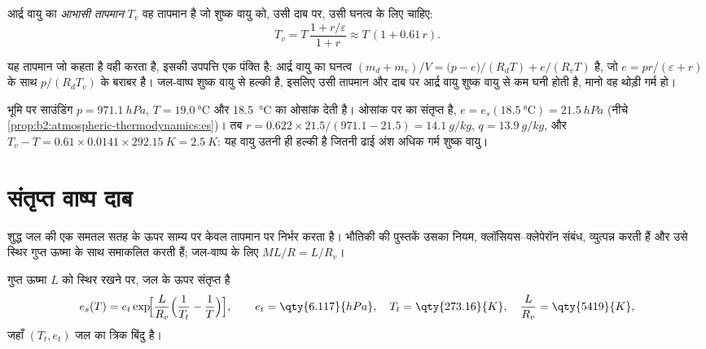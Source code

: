 \begin{definition}[आभासी तापमान]\label{def:b2:atmospheric-thermodynamics:virtual}
आर्द्र वायु का \emph{आभासी तापमान} $T_v$ वह तापमान है
जो शुष्क वायु को, उसी दाब पर, उसी घनत्व के लिए चाहिए:
\[
  T_v = T\,\frac{1 + r/\varepsilon}{1 + r} \approx T\,(1 + 0.61\,r) .
\]
\end{definition}

यह तापमान जो कहता है वही करता है, इसकी उपपत्ति एक पंक्ति है: आर्द्र वायु का घनत्व
$(m_d + m_v)/V = \bigl(p - e\bigr)/(R_dT) + e/(R_vT)$ है, जो $e = pr/(\varepsilon + r)$ के साथ
$p/(R_dT_v)$ के बराबर है। जल-वाष्प शुष्क वायु से हल्की है, इसलिए उसी तापमान और दाब पर आर्द्र वायु शुष्क
वायु से कम घनी होती है, मानो वह थोड़ी गर्म हो।

\begin{example}[नॉर्मन की वायु]\label{ex:b2:atmospheric-thermodynamics:norman}
भूमि पर साउंडिंग $p = \qty{971.1}{hPa}$, $T = \qty{19.0}{\celsius}$ और
\qty{18.5}{\celsius} का ओसांक देती है।  ओसांक पर का संतृप्त  है,
$e = e_s(\qty{18.5}{\celsius}) = \qty{21.5}{hPa}$ (नीचे \cref{prop:b2:atmospheric-thermodynamics:es})।
तब $r = 0.622 \times 21.5/(971.1 - 21.5) = \qty{14.1}{g/kg}$, $q = \qty{13.9}{g/kg}$,
और $T_v - T = 0.61 \times 0.0141 \times \qty{292.15}{K} = \qty{2.5}{K}$: यह वायु उतनी ही हल्की है जितनी
ढाई अंश अधिक गर्म शुष्क वायु।
\end{example}

\section{संतृप्त वाष्प दाब}\label{sec:b2:atmospheric-thermodynamics:saturation}

शुद्ध जल की एक समतल सतह के ऊपर साम्य पर  केवल तापमान पर निर्भर करता है।
भौतिकी की पुस्तकें उसका नियम, क्लॉसियस--क्लेपेरॉन संबंध, व्युत्पन्न करती हैं और उसे
स्थिर गुप्त ऊष्मा के साथ समाकलित करती हैं; जल-वाष्प के लिए $M L/R = L/R_v$।

\begin{proposition}[संतृप्त वाष्प दाब]\label{prop:b2:atmospheric-thermodynamics:es}
गुप्त ऊष्मा $L$ को स्थिर रखने पर, जल के ऊपर संतृप्त  है
\[
  e_s(T) = e_t \exp\!\Bigl[\frac{L}{R_v}\Bigl(\frac{1}{T_t} - \frac{1}{T}\Bigr)\Bigr],
  \qquad e_t = \qty{6.117}{hPa}, \quad T_t = \qty{273.16}{K}, \quad \frac{L}{R_v} =
  \qty{5419}{K},
\]
जहाँ $(T_t, e_t)$ जल का त्रिक बिंदु है।
\end{proposition}

